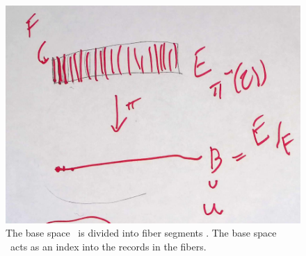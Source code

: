 \documentclass[../main.tex]{subfiles}
\begin{document}
\begin{figure}[H]
    \includegraphics[width=.5\linewidth]{figures/math/k_qspace.png}
    \caption{The base space \dtotal\ is divided into fiber segments \dfiber. The base space \dbase\ acts as an index into the records in the fibers.
    }
    \label{fig:base_space_div}
\end{figure}
\end{document}
